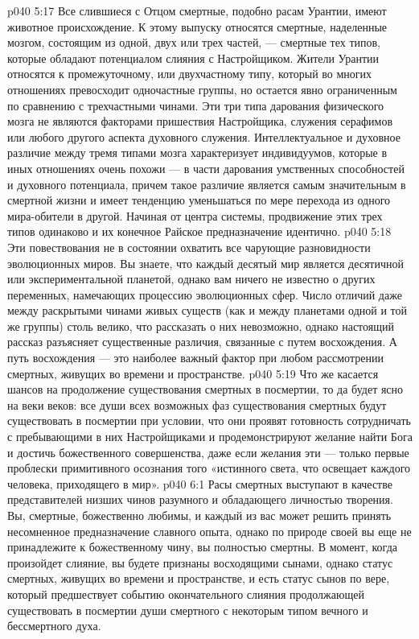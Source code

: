 \vs p040 5:17 \pc {} Все слившиеся с Отцом смертные, подобно расам Урантии, имеют животное происхождение. К этому выпуску относятся смертные, наделенные мозгом, состоящим из одной, двух или трех частей, --- смертные тех типов, которые обладают потенциалом слияния с Настройщиком. Жители Урантии относятся к промежуточному, или двухчастному типу, который во многих отношениях превосходит одночастные группы, но остается явно ограниченным по сравнению с трехчастными чинами. Эти три типа дарования физического мозга не являются факторами пришествия Настройщика, служения серафимов или любого другого аспекта духовного служения. Интеллектуальное и духовное различие между тремя типами мозга характеризует индивидуумов, которые в иных отношениях очень похожи --- в части дарования умственных способностей и духовного потенциала, причем такое различие является самым значительным в смертной жизни и имеет тенденцию уменьшаться по мере перехода из одного мира\hyp{}обители в другой. Начиная от центра системы, продвижение этих трех типов одинаково и их конечное Райское предназначение идентично.
\vs p040 5:18 \pc {} Эти повествования не в состоянии охватить все чарующие разновидности эволюционных миров. Вы знаете, что каждый десятый мир является десятичной или экспериментальной планетой, однако вам ничего не известно о других переменных, намечающих процессию эволюционных сфер. Число отличий даже между раскрытыми чинами живых существ (как и между планетами одной и той же группы) столь велико, что рассказать о них невозможно, однако настоящий рассказ разъясняет существенные различия, связанные с путем восхождения. А путь восхождения --- это наиболее важный фактор при любом рассмотрении смертных, живущих во времени и пространстве.
\vs p040 5:19 \pc Что же касается шансов на продолжение существования смертных в посмертии, то да будет ясно на веки веков: все души всех возможных фаз существования смертных будут существовать в посмертии при условии, что они проявят готовность сотрудничать с пребывающими в них Настройщиками и продемонстрируют желание найти Бога и достичь божественного совершенства, даже если желания эти --- только первые проблески примитивного осознания того «истинного света, что освещает каждого человека, приходящего в мир».
\vs p040 6:1 Расы смертных выступают в качестве представителей низших чинов разумного и обладающего личностью творения. Вы, смертные, божественно любимы, и каждый из вас может решить принять несомненное предназначение славного опыта, однако по природе своей вы еще не принадлежите к божественному чину, вы полностью смертны. В момент, когда произойдет слияние, вы будете признаны восходящими сынами, однако статус смертных, живущих во времени и пространстве, и есть статус сынов по вере, который предшествует событию окончательного слияния продолжающей существовать в посмертии души смертного с некоторым типом вечного и бессмертного духа.
